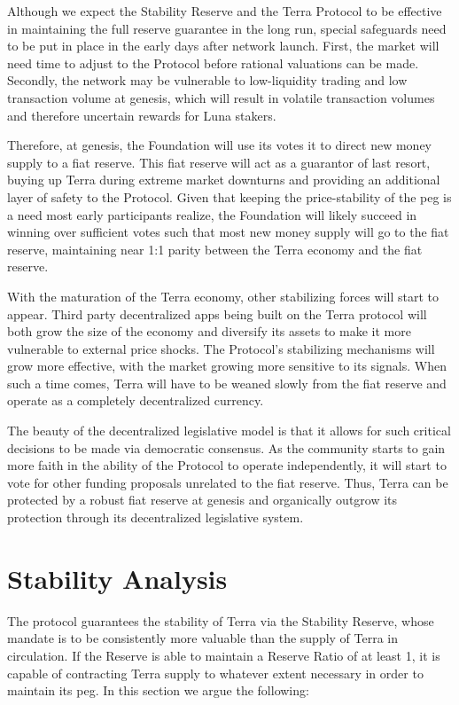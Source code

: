 \documentclass{article}
\begin{document}
Although we expect the Stability Reserve and the Terra Protocol to be effective in maintaining the full reserve guarantee in the long run, special safeguards need to be put in place in the early days after network launch. First, the market will need time to adjust to the Protocol before rational valuations can be made. Secondly, the network may be vulnerable to low-liquidity trading and low transaction volume at genesis, which will result in volatile transaction volumes and therefore uncertain rewards for Luna stakers. 

Therefore, at genesis, the Foundation will use its votes it to direct new money supply to a fiat reserve. This fiat reserve will act as a guarantor of last resort, buying up Terra during extreme market downturns and providing an additional layer of safety to the Protocol. Given that keeping the price-stability of the peg is a need most early participants realize, the Foundation will likely succeed in winning over sufficient votes such that most new money supply will go to the fiat reserve, maintaining near 1:1 parity between the Terra economy and the fiat reserve. 

With the maturation of the Terra economy, other stabilizing forces will start to appear. Third party decentralized apps being built on the Terra protocol will both grow the size of the economy and diversify its assets to make it more vulnerable to external price shocks. The Protocol's stabilizing mechanisms will grow more effective, with the market growing more sensitive to its signals. When such a time comes, Terra will have to be weaned slowly from the fiat reserve and operate as a completely decentralized currency.

The beauty of the decentralized legislative model is that it allows for such critical decisions to be made via democratic consensus. As the community starts to gain more faith in the ability of the Protocol to operate independently, it will start to vote for other funding proposals unrelated to the fiat reserve. Thus, Terra can be protected by a robust fiat reserve at genesis and organically outgrow its protection through its decentralized legislative system.


\section{Stability Analysis}

The protocol guarantees the stability of Terra via the Stability Reserve, whose mandate is to be consistently more valuable than the supply of Terra in circulation. If the Reserve is able to maintain a Reserve Ratio of at least 1, it is capable of contracting Terra supply to whatever extent necessary in order to maintain its peg. In this section we argue the following:
\end{document}
